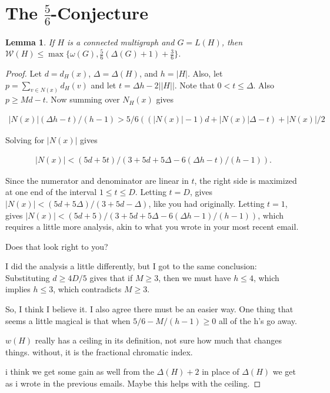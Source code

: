 \documentclass[12pt]{amsart}
\theoremstyle{plain}
\newtheorem{lem}[thm]{Lemma}
\theoremstyle{definition}
\theoremstyle{remark}
\newcommand{\fancy}[1]{\mathcal{#1}}
\newcommand{\W}{\fancy{W}}
\begin{document}
\section{The $\frac56$-Conjecture}
\begin{lem}
If $H$ is a connected multigraph and $G = L(H)$, then $\W(H) \le
\max\{\omega(G), \frac56(\Delta(G) + 1) + \frac36\}$.
\end{lem}
\begin{proof}
Let $d = d_H(x)$,  $\Delta = \Delta(H)$, and $h = |H|$. 
Also, let $p = \sum_{v \in N(x)} d_H(v)$ and
let $t = \Delta h-2||H||$.
Note that $0 < t \le \Delta$.  Also $p \ge Md - t$.  Now summing over $N_H(x)$
gives

\begin{align*}
|N(x)|(\Delta h-t)/(h-1) > 5/6((|N(x)|-1)d + |N(x)|\Delta - t) + |N(x)|/2
\end{align*}

Solving for $|N(x)|$ gives

\begin{align*}
|N(x)| < (5d+5t)/(3+5d+5\Delta-6(\Delta h-t)/(h-1)).
\end{align*}

Since the numerator and denominator are linear in $t$, the right side is
maximized at one end of the interval $1 \le t \le D$.  Letting $t = D$,
gives $|N(x)| < (5d+5\Delta)/(3+5d-\Delta)$, like you had originally.  Letting $t = 1$,
gives $|N(x)| < (5d+5)/(3+5d+5\Delta-6(\Delta h-1)/(h-1))$, which requires a little more
analysis, akin to what you wrote in your most recent email.

Does that look right to you?



I did the analysis a little differently, but I got to the same
conclusion: Substituting $d \ge 4D/5$ gives that if $M \ge 3$, then we
must have $h \le 4$, which implies $h \le 3$, which contradicts $M \ge 3$.

So, I think I believe it.  I also agree there must be an easier way.
One thing that seems a little magical is that when $5/6 - M/(h-1) \ge 0$
all of the h's go away.

$w(H)$ really has a ceiling in its definition, not sure how much that changes
things.   without, it is the fractional chromatic index.

i think we get some gain as well from the $\Delta(H) + 2$ in place of $\Delta(H)$
we get as i wrote in the previous emails.   Maybe this helps with the ceiling.


\end{proof}
\end{document}
